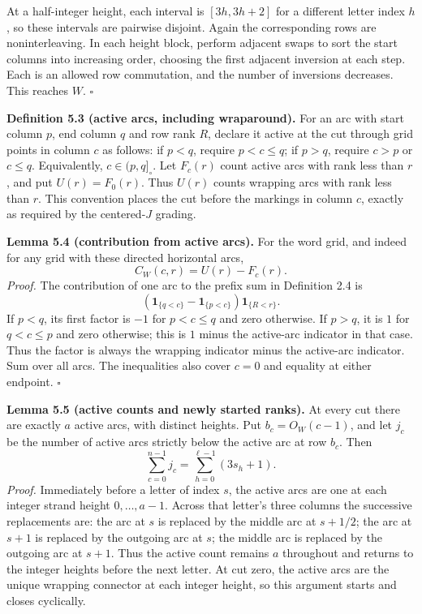 \documentclass[11pt,a4paper]{article}
\begin{document}
At a half-integer height, each interval is $[3h,3h+2]$ for a
different letter index $h$, so these intervals are pairwise
disjoint. Again the corresponding rows are noninterleaving.
In each height block, perform adjacent swaps to sort the start
columns into increasing order, choosing the first adjacent
inversion at each step. Each is an allowed row commutation,
and the number of inversions decreases. This reaches $W$.
$\square$

\textbf{Definition 5.3 (active arcs, including wraparound).}
For an arc with start column $p$, end column $q$ and row rank $R$,
declare it active at the cut through grid points in column $c$ as
follows: if $p<q$, require $p<c\le q$; if $p>q$, require $c>p$
or $c\le q$. Equivalently, $c\in(p,q]_{\circ}$.
Let $F_c(r)$ count active arcs with rank less than $r$, and put
$U(r)=F_0(r)$. Thus $U(r)$ counts wrapping arcs with rank less
than $r$. This convention places the cut before the markings in
column $c$, exactly as required by the centered-$J$ grading.

\textbf{Lemma 5.4 (contribution from active arcs).}
For the word grid, and indeed for any grid with these directed
horizontal arcs,
\[
C_W(c,r)=U(r)-F_c(r).
\]
\textit{Proof.}
The contribution of one arc to the prefix sum in Definition 2.4 is
\[
\left(\mathbf1_{\{q<c\}}-\mathbf1_{\{p<c\}}\right)
\mathbf1_{\{R<r\}}.
\]
If $p<q$, its first factor is $-1$ for $p<c\le q$ and zero
otherwise. If $p>q$, it is $1$ for $q<c\le p$ and zero otherwise;
this is $1$ minus the active-arc indicator in that case.
Thus the factor is always the wrapping indicator minus the
active-arc indicator. Sum over all arcs. The inequalities also
cover $c=0$ and equality at either endpoint. $\square$

\textbf{Lemma 5.5 (active counts and newly started ranks).}
At every cut there are exactly $a$ active arcs, with distinct
heights. Put $b_c=O_W(c-1)$, and let $j_c$ be the number of active
arcs strictly below the active arc at row $b_c$. Then
\[
\sum_{c=0}^{n-1}j_c=\sum_{h=0}^{\ell-1}(3s_h+1).
\]
\textit{Proof.}
Immediately before a letter of index $s$, the active arcs are
one at each integer strand height $0,\ldots,a-1$. Across that
letter's three columns the successive replacements are:
the arc at $s$ is replaced by the middle arc at $s+1/2$;
the arc at $s+1$ is replaced by the outgoing arc at $s$;
the middle arc is replaced by the outgoing arc at $s+1$.
Thus the active count remains $a$ throughout and returns to
the integer heights before the next letter. At cut zero, the
active arcs are the unique wrapping connector at each integer
height, so this argument starts and closes cyclically.
\end{document}
